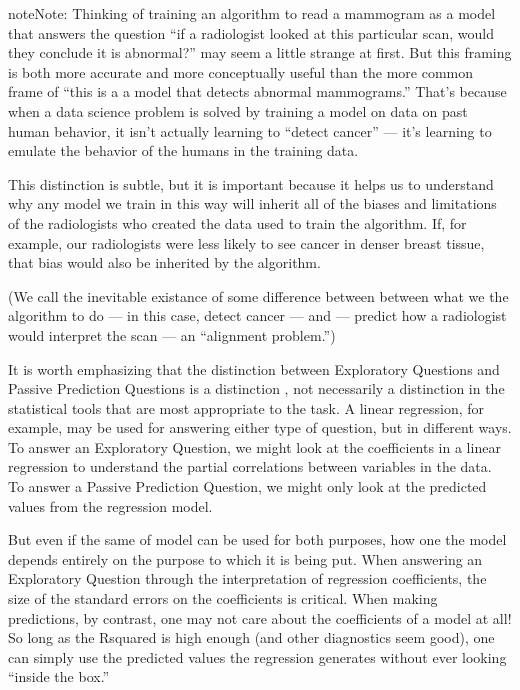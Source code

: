 \documentclass[letterpaper,10pt,english]{jupyterBook}
\begin{document}
\begin{sphinxadmonition}{note}{Note:}
\sphinxAtStartPar
Thinking of training an algorithm to read a mammogram as a model that answers the question “if a radiologist looked at this particular scan, would they conclude it is abnormal?” may seem a little strange at first. But this framing is both more accurate and more conceptually useful than the more common frame of “this is a a model that detects abnormal mammograms.” That’s because when a data science problem is solved by training a model on data on past human behavior, it isn’t actually learning to “detect cancer” — it’s learning to emulate the behavior of the humans in the training data.

\sphinxAtStartPar
This distinction is subtle, but it is important because it helps us to understand why any model we train in this way will inherit all of the biases and limitations of the radiologists who created the data used to train the algorithm. If, for example, our radiologists were less likely to see cancer in denser breast tissue, that bias would also be inherited by the algorithm.

\sphinxAtStartPar
(We call the inevitable existance of some difference between between what we  the algorithm to do — in this case, detect cancer — and  — predict how a radiologist would interpret the scan — an “alignment problem.”)
\end{sphinxadmonition}

\sphinxAtStartPar
It is worth emphasizing that the distinction between Exploratory Questions and Passive Prediction Questions is a distinction , not necessarily a distinction in the statistical tools that are most appropriate to the task. A linear regression, for example, may be used for answering either type of question, but in different ways. To answer an Exploratory Question, we might look at the coefficients in a linear regression to understand the partial correlations between variables in the data. To answer a Passive Prediction Question, we might only look at the predicted values from the regression model.

\sphinxAtStartPar
But even if the same  of model can be used for both purposes, how one  the model depends entirely on the purpose to which it is being put. When answering an Exploratory Question through the interpretation of regression coefficients, the size of the standard errors on the coefficients is critical. When making predictions, by contrast, one may not care about the coefficients of a model at all! So long as the R\sphinxhyphen{}squared is high enough (and other diagnostics seem good), one can simply use the predicted values the regression generates without ever looking “inside the box.”
\end{document}
